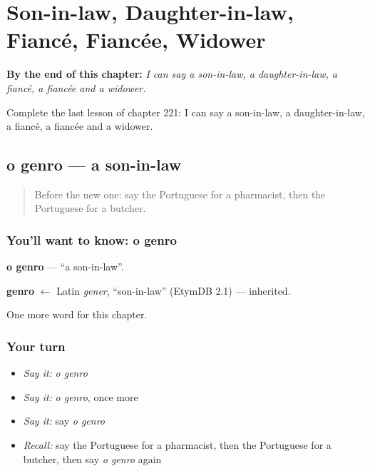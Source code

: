 
\chapter{Son-in-law, Daughter-in-law, Fiancé, Fiancée, Widower}
\label{ch:pt-son-in-law-daughter-in-law-fiance-fiancee-widower}

\begin{chapteropening}
\textbf{By the end of this chapter:} \emph{I can say a son-in-law, a daughter-in-law, a fiancé, a fiancée and a widower.}

Complete the last lesson of chapter 221: I can say a son-in-law, a daughter-in-law, a fiancé, a fiancée and a widower.
\end{chapteropening}

\section[o genro]{o genro — a son-in-law}

\label{lesson:PT-C221-genro}



\begin{quote}
Before the new one: say the Portuguese for a pharmacist, then the Portuguese for a butcher.
\end{quote}

\subsection*{You'll want to know: o genro}
\textbf{o genro} — \textquotedblleft{}a son-in-law\textquotedblright{}.

\begin{cousinweb}
\textbf{genro} $\leftarrow$ Latin \emph{gener}, \textquotedblleft{}son-in-law\textquotedblright{} (EtymDB 2.1) — inherited.
\end{cousinweb}

\begin{grammarlens}[title={What you've built}]
One more word for this chapter.
\end{grammarlens}

\subsection*{Your turn}
\begin{itemize}
\raggedright
  \item \emph{Say it:} \emph{o genro}
  \item \emph{Say it:} \emph{o genro}, once more
  \item \emph{Say it:} say \emph{o genro}
  \item \emph{Recall:} say the Portuguese for a pharmacist, then the Portuguese for a butcher, then say \emph{o genro} again
\end{itemize}

